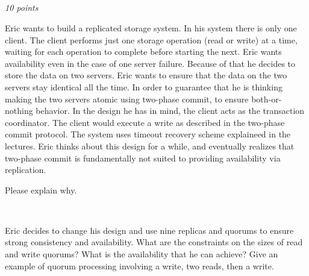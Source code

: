 \documentclass[a4paper]{article}
\newcommand{\points}[1]{\subsection{} \textit{#1 points}\\}
\newcommand{\question}[2][]{
  \parbox[t]{\textwidth}{
    \ifthenelse{\equal{#1}{}}{}{#1)}
    \parbox[t]{0.95\textwidth}{#2}}\\}
\begin{document}
\points{10}
\question[a]{Eric wants to build a replicated storage system. In his
  system there is only one client. The client performs just one
  storage operation (read or write) at a time, waiting for each
  operation to complete before starting the next. Eric wants
  availability even in the case of one server failure. Because of that
  he decides to store the data on two servers. Eric wants to ensure
  that the data on the two servers stay identical all the time. In
  order to guarantee that he is thinking making the two servers atomic
  using two-phase commit, to ensure both-or-nothing behavior. In the
  design he has in mind, the client acts as the transaction
  coordinator. The client would execute a write as described in the
  two-phase commit protocol. The system uses timeout recovery scheme
  explaineed in the lectures. Eric thinks about this design for a
  while, and eventually realizes that two-phase commit is
  fundamentally not suited to providing availability via
  replication.

  Please explain why.}
\question[b]{
  Eric decides to change his design and use nine replicas
  and quorums to ensure strong consistency and availability. What are
  the constraints on the sizes of read and write quorums? What is the
  availability that he can achieve? Give an example of quorum
  processing involving a write, two reads, then a write.}
% 
\end{document}
